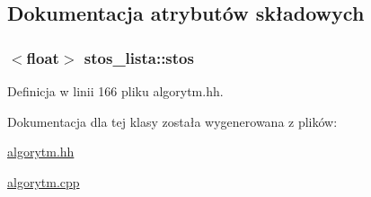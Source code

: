 \subsection{\-Dokumentacja atrybutów składowych}
\hypertarget{classstos__lista_a94fc88e5b40c7a44e2e34a6f0441853f}{
\subsubsection[{stos}]{$<$float$>$ {\bf stos\-\_\-lista\-::stos}}}\label{classstos__lista_a94fc88e5b40c7a44e2e34a6f0441853f}


\-Definicja w linii 166 pliku algorytm.\-hh.



\-Dokumentacja dla tej klasy została wygenerowana z plików\-:\begin{DoxyCompactItemize}
\item 
\hyperlink{algorytm_8hh}{algorytm.\-hh}\item 
\hyperlink{algorytm_8cpp}{algorytm.\-cpp}\end{DoxyCompactItemize}
